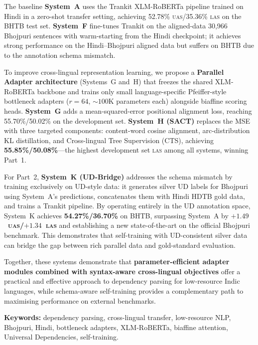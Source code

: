 \documentclass[12pt,a4paper,oneside]{report}
\newcommand{\xlmr}{XLM-RoBERTa}
\newcommand{\uas}{\textsc{uas}}
\newcommand{\las}{\textsc{las}}
\begin{document}
\vspace{0.4cm}
\noindent The baseline \textbf{System~A} uses the Trankit \xlmr{} pipeline trained on Hindi
in a zero-shot transfer setting, achieving 52.78\% \uas{}/35.36\% \las{} on the BHTB
test set. \textbf{System~F} fine-tunes Trankit on the aligned-data 30,966 Bhojpuri
sentences with warm-starting from the Hindi checkpoint; it achieves strong performance
on the Hindi--Bhojpuri aligned data but suffers on BHTB due to the annotation schema mismatch.

\vspace{0.4cm}
\noindent To improve cross-lingual representation learning, we propose a
\textbf{Parallel Adapter architecture} (Systems~G and~H) that freezes the shared
\xlmr{} backbone and trains only small language-specific Pfeiffer-style bottleneck
adapters ($r=64$, ${\sim}100$K parameters each) alongside biaffine scoring heads.
\textbf{System~G} adds a mean-squared-error positional alignment loss, reaching
55.70\%/50.02\% on the development set. \textbf{System~H (SACT)} replaces the MSE
with three targeted components: content-word cosine alignment, arc-distribution KL
distillation, and Cross-lingual Tree Supervision (CTS), achieving
\textbf{55.85\%/50.08\%}---the highest development set \las{} among all systems,
winning Part~1.

\vspace{0.4cm}
\noindent For Part~2, \textbf{System~K (UD-Bridge)} addresses the schema
mismatch by training exclusively on UD-style data: it generates silver UD labels for
Bhojpuri using System~A's predictions, concatenates them with Hindi HDTB gold data,
and trains a Trankit pipeline. By operating entirely in the UD annotation space,
System~K achieves \textbf{54.27\%/36.70\%} on BHTB, surpassing System~A by
\textbf{$+1.49$~\uas{}/$+1.34$~\las{}} and establishing a new state-of-the-art on
the official Bhojpuri benchmark. This demonstrates that self-training with
UD-consistent silver data can bridge the gap between rich parallel data and
gold-standard evaluation.

\vspace{0.4cm}
\noindent Together, these systems demonstrate that \textbf{parameter-efficient adapter
modules combined with syntax-aware cross-lingual objectives} offer a practical and
effective approach to dependency parsing for low-resource Indic languages, while
schema-aware self-training provides a complementary path to maximising performance
on external benchmarks.

\vspace{0.5cm}
\noindent \textbf{Keywords:} dependency parsing, cross-lingual transfer, low-resource
NLP, Bhojpuri, Hindi, bottleneck adapters, XLM-RoBERTa, biaffine attention, Universal
Dependencies, self-training.
\end{document}

